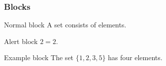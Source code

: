 \documentclass[11pt]{beamer}
\begin{document}
\begin{frame}
  \frametitle{Blocks}

  \begin{block}{Normal block}
A \alert{set} consists of elements.
\end{block}

\begin{alertblock}{Alert block}
$2=2$.
\end{alertblock}

\begin{exampleblock}{Example block}
The set $\{1,2,3,5\}$ has four elements.
\end{exampleblock}

\end{frame}
\end{document}
